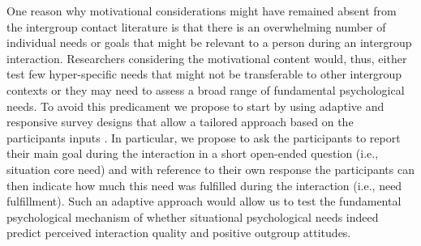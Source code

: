\documentclass[man, 12pt, a4paper]{apa7}
\theoremstyle{break}
\theoremstyle{plain}
\begin{document}
One reason why motivational considerations might have remained absent from the intergroup contact literature is that there is an overwhelming number of individual needs or goals that might be relevant to a person during an intergroup interaction. Researchers considering the motivational content would, thus, either test few hyper-specific needs that might not be transferable to other intergroup contexts or they may need to assess a broad range of fundamental psychological needs. To avoid this predicament we propose to start by using adaptive and responsive survey designs that allow a tailored approach based on the participants inputs \citep[e.g.,][]{Tourangeau2017}. In particular, we propose to ask the participants to report their main goal during the interaction in a short open-ended question (i.e., situation core need) and with reference to their own response the participants can then indicate how much this need was fulfilled during the interaction (i.e., need fulfillment). Such an adaptive approach would allow us to test the fundamental psychological mechanism of whether situational psychological needs indeed predict perceived interaction quality and positive outgroup attitudes. 
\end{document}
